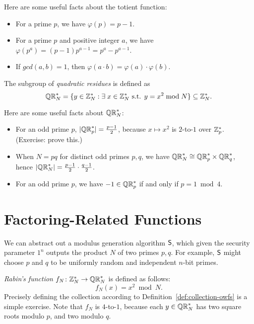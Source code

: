 \documentclass[11pt]{article}
\begin{document}
\noindent Here are some useful facts about the totient function:
\begin{itemize}
\item For a prime $p$, we have $\varphi(p) = p - 1$.
\item For a prime $p$ and positive integer $a$, we have $\varphi(p^a)
  = (p-1) p^{a-1} = p^a - p^{a-1}$.
\item If $gcd(a,b) = 1$, then $\varphi(a \cdot b) = \varphi(a) \cdot
  \varphi(b)$.
\end{itemize}

\begin{definition}
  The subgroup of \emph{quadratic residues} is defined as \[ \mathbb{QR}_{N}^{*}
  = \{y \in \mathbb{Z}_N^{*} : \exists\; x \in \mathbb{Z}_N^{*} \text{ s.t. } y = x^2
    \bmod N\} \subseteq \mathbb{Z}_N^{*}. \]
\end{definition}

\noindent Here are some useful facts about $\mathbb{QR}_{N}^{*}$:
\begin{itemize}
\item For an odd prime $p$, $\lvert\mathbb{QR}_{p}^{*}\rvert = \frac{p-1}{2}$, because
  $x \mapsto x^{2}$ is $2$-to-$1$ over $\mathbb{Z}_p^{*}$.  (Exercise: prove
  this.)

\item When $N = pq$ for distinct odd primes $p,q$, we have $\mathbb{QR}_{N}^{*}
  \cong \mathbb{QR}_{p}^{*} \times \mathbb{QR}_{q}^{*}$, hence $\lvert\mathbb{QR}_{N}^{*}\rvert =
  \frac{p-1}{2} \cdot \frac{q-1}{2}$.

\item For an odd prime $p$, we have $-1 \in \mathbb{QR}_{p}^{*}$ if and only if
  $p = 1 \bmod 4$.
\end{itemize}

\section{Factoring-Related Functions}
\label{sec:fact-related}

We can abstract out a modulus generation algorithm $\mathsf{S}$, which
given the security parameter $1^{n}$ outputs the product $N$ of two
primes $p,q$.  For example, $\mathsf{S}$ might choose $p$ and $q$ to be
uniformly random and independent $n$-bit primes.

\emph{Rabin's function} $f_{N} \colon \mathbb{Z}_N^{*} \to \mathbb{QR}_{N}^{*}$ is defined
as follows: \[ f_{N}(x) = x^{2} \bmod N. \] Precisely defining the
collection according to Definition~\ref{def:collection-owfs} is a
simple exercise.  Note that $f_{N}$ is $4$-to-$1$, because each $y \in
\mathbb{QR}_{N}^{*}$ has two square roots modulo $p$, and two modulo $q$.
\end{document}
